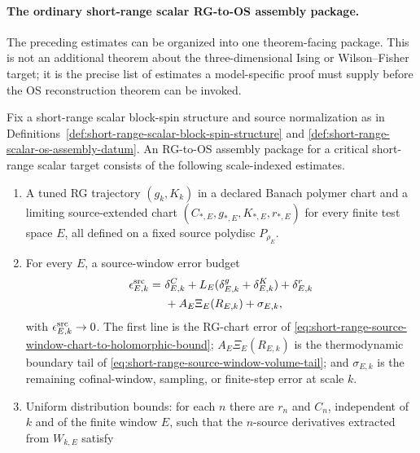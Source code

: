\paragraph{The ordinary short-range scalar RG-to-OS assembly package.}
The preceding estimates can be organized into one theorem-facing package.  This
is not an additional theorem about the three-dimensional Ising or
Wilson--Fisher target; it is the precise list of estimates a model-specific
proof must supply before the OS reconstruction theorem can be invoked.

\begin{definition}
\label{def:short-range-rg-to-os-assembly-datum}
Fix a short-range scalar block-spin structure and source normalization as in
Definitions~\ref{def:short-range-scalar-block-spin-structure} and
\ref{def:short-range-scalar-os-assembly-datum}.  An RG-to-OS assembly package
for a critical short-range scalar target consists of the following
scale-indexed estimates.
\begin{enumerate}
  \item A tuned RG trajectory \((g_k,K_k)\) in a declared Banach polymer chart
  and a limiting source-extended chart
  \((C_{\ast,E},g_{\ast,E},K_{\ast,E},r_{\ast,E})\) for every finite test
  space \(E\), all defined on a fixed source polydisc \(P_{\rho_E}\).
  \item For every \(E\), a source-window error budget
  \begin{equation}
  \begin{aligned}
    \epsilon^{\rm src}_{E,k}
    =
    &\ \delta^C_{E,k}
      +L_E(\delta^g_{E,k}+\delta^K_{E,k})
      +\delta^r_{E,k}                                      \\
    &\ +A_E\Xi_E(R_{E,k})
      +\sigma_{E,k},
  \end{aligned}
  \label{eq:short-range-rg-to-os-source-budget}
  \end{equation}
  with \(\epsilon^{\rm src}_{E,k}\to0\).  The first line is the RG-chart
  error of \eqref{eq:short-range-source-window-chart-to-holomorphic-bound};
  \(A_E\Xi_E(R_{E,k})\) is the thermodynamic boundary tail of
  \eqref{eq:short-range-source-window-volume-tail}; and
  \(\sigma_{E,k}\) is the remaining cofinal-window, sampling, or
  finite-step error at scale \(k\).
  \item Uniform distribution bounds: for each \(n\) there are \(r_n\) and
  \(C_n\), independent of \(k\) and of the finite window \(E\), such that the
  \(n\)-source derivatives extracted from \(W_{k,E}\) satisfy

\end{enumerate}
\end{definition}

